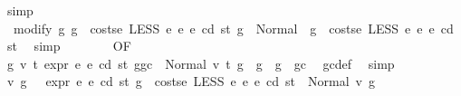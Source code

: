 \begin{isabellebody}
\ simp\isanewline
\ \ \ \ \ \ \isamarkupfalse%
\ \isamarkupfalse%
\ {\isacharasterisk}{\kern0pt}{\isacharasterisk}{\kern0pt}{\isacharcolon}{\kern0pt}\ {\isachardoublequoteopen}modify\ {\isacharparenleft}{\kern0pt}{\isasymlambda}g{\isachardot}{\kern0pt}\ g\ {\isacharminus}{\kern0pt}\ costs\isactrlsub e\ {\isacharparenleft}{\kern0pt}LESS\ e{}\ e{}{\isacharparenright}{\kern0pt}\ e\ cd\ st{\isacharparenright}{\kern0pt}\ g\ {\isacharequal}{\kern0pt}\ Normal\ {\isacharparenleft}{\kern0pt}{\isacharparenleft}{\kern0pt}{\isacharparenright}{\kern0pt}{\isacharcomma}{\kern0pt}\ g\ {\isacharminus}{\kern0pt}\ costs\isactrlsub e\ {\isacharparenleft}{\kern0pt}LESS\ e{}\ e{}{\isacharparenright}{\kern0pt}\ e\ cd\ st{\isacharparenright}{\kern0pt}{\isachardoublequoteclose}\ \isamarkupfalse%
\ simp\isanewline
\ \ \ \ \ \ \isamarkupfalse%
\ {}{}{\isacharparenleft}{\kern0pt}{}{\isacharparenright}{\kern0pt}{\isacharbrackleft}{\kern0pt}OF\ {\isacharasterisk}{\kern0pt}\ {\isacharasterisk}{\kern0pt}{\isacharasterisk}{\kern0pt}{\isacharbrackright}{\kern0pt}\ \isamarkupfalse%
\ {\isachardoublequoteopen}{\isasymAnd}g{}{\isacharprime}{\kern0pt}\ v{}\ t{}{\isachardot}{\kern0pt}\ expr\ e{}\ e\ cd\ st\ {\isacharparenleft}{\kern0pt}g{\isacharminus}{\kern0pt}gc{\isacharparenright}{\kern0pt}\ {\isacharequal}{\kern0pt}\ Normal\ {\isacharparenleft}{\kern0pt}{\isacharparenleft}{\kern0pt}v{}{\isacharcomma}{\kern0pt}\ t{}{\isacharparenright}{\kern0pt}{\isacharcomma}{\kern0pt}\ g{}{\isacharprime}{\kern0pt}{\isacharparenright}{\kern0pt}\ {\isasymLongrightarrow}\ g{}{\isacharprime}{\kern0pt}\ {\isasymle}\ g\ {\isacharminus}{\kern0pt}\ gc{\isachardoublequoteclose}\ \isamarkupfalse%
\ gc{\isacharunderscore}{\kern0pt}def\ \isamarkupfalse%
\ simp\isanewline
\ \ \ \ \ \ \isamarkupfalse%
\ \isamarkupfalse%
\ v\ g{\isacharprime}{\kern0pt}\ \ {\isacharasterisk}{\kern0pt}{\isacharasterisk}{\kern0pt}{\isacharasterisk}{\kern0pt}{\isacharcolon}{\kern0pt}\ {\isachardoublequoteopen}expr\ e{}\ e\ cd\ st\ {\isacharparenleft}{\kern0pt}g\ {\isacharminus}{\kern0pt}\ costs\isactrlsub e\ {\isacharparenleft}{\kern0pt}LESS\ e{}\ e{}{\isacharparenright}{\kern0pt}\ e\ cd\ st{\isacharparenright}{\kern0pt}\ {\isacharequal}{\kern0pt}\ Normal\ {\isacharparenleft}{\kern0pt}v{\isacharcomma}{\kern0pt}\ g{\isacharprime}{\kern0pt}{\isacharparenright}{\kern0pt}{\isachardoublequoteclose}\ \isamarkupfalse%

\end{isabellebody}
